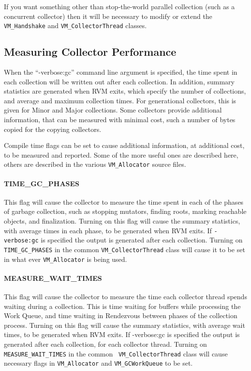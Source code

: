 If you want something other than stop-the-world parallel collection 
(such as a concurrent collector) then it will be necessary to modify
or extend the {\tt VM\_Handshake} and {\tt VM\_CollectorThread} classes.

\subsection{Measuring Collector Performance} \label{sssec:verbosegc}
When the ``-verbose:gc'' command line argument is specified, the time
spent in each collection will be written out after each collection.
In addition, summary statistics are generated when RVM exits, which
specify the number of collections, and average and maximum collection times.
For generational collectors, this is given for Minor and Major collections.
Some collectors provide additional information, that can be measured
with minimal cost, such a number of bytes copied for the copying collectors.

Compile time flags can be set to cause additional information, at additional
cost, to be measured and reported.  Some of the more useful ones are
described here, others are described in the various {\tt VM\_Allocator}
source files.

\paragraph{TIME\_GC\_PHASES}
This flag will cause the collector to measure the time spent in each
of the phases of garbage collection, such as stopping mutators, finding roots,
marking reachable objects, and finalization.  Turning on this flag will cause
the summary statistics, with average times in each phase, to be generated 
when RVM exits.  If {\tt -verbose:gc} is specified the output is generated after
each collection. Turning on {\tt TIME\_GC\_PHASES} in the common 
{\tt VM\_CollectorThread}
class will cause it to be set in what ever 
{\tt VM\_Allocator} is being used.

\paragraph{MEASURE\_WAIT\_TIMES}
This flag will cause the collector to measure the time each collector thread
spends waiting during a collection.  This is time waiting for buffers while
processing the Work Queue, and time waiting in Rendezvous between phases of the
collection process. Turning on this flag will cause
the summary statistics, with average wait times, to be generated 
when RVM exits.  If -verbose:gc is specified the output is generated after
each collection, for each collector thread.
Turning on {\tt MEASURE\_WAIT\_TIMES} in the common {\tt
VM\_CollectorThread}
class will cause necessary flags in {\tt VM\_Allocator} and 
{\tt VM\_GCWorkQueue} to be set.

